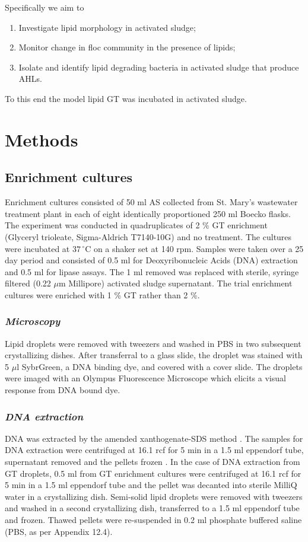 \documentclass{article}
\begin{document}
\noindent
Specifically we aim to

\begin{enumerate}
\item Investigate lipid morphology in activated sludge;
\item Monitor change in floc community in the presence of lipids;
\item Isolate and identify lipid degrading bacteria in activated sludge that produce AHLs.
\end{enumerate}
To this end the model lipid GT was incubated in activated sludge.
\newpage
\section{Methods}

\subsection{Enrichment cultures}
Enrichment cultures consisted of 50 ml AS collected from St. Mary's wastewater treatment plant in each of eight identically proportioned 250 ml Boecko flasks. The experiment was conducted in quadruplicates of 2 \% GT enrichment (Glyceryl trioleate, Sigma-Aldrich T7140-10G) and no treatment. The cultures were incubated at $37\,^{\circ}\mathrm{C}$ on a shaker set at 140 rpm. Samples were taken over a 25 day period and consisted of 0.5 ml for Deoxyribonucleic Acids (DNA) extraction and 0.5 ml for lipase assays. The 1 ml removed was replaced with sterile, syringe filtered (0.22 $\mu$m Millipore) activated sludge supernatant. The trial enrichment cultures were enriched with 1 \% GT rather than 2 \%.

\subsubsection{\emph{Microscopy}}
Lipid droplets were removed with tweezers and washed in PBS in two subsequent crystallizing dishes. After transferral to a glass slide, the droplet was stained with 5 $\mu$l SybrGreen, a DNA binding dye, and covered with a cover slide. The droplets were imaged with an Olympus Fluorescence Microscope which elicits a visual response from DNA bound dye.

\subsubsection{\emph{DNA extraction}}
DNA was extracted by the amended xanthogenate-SDS method \cite{tillett2000xanthogenate}. The samples for DNA extraction were centrifuged at 16.1 rcf for 5 min in a 1.5 ml eppendorf tube, supernatant removed and the pellets frozen . In the case of DNA extraction from GT droplets, 0.5 ml from GT enrichment cultures were centrifuged at 16.1 rcf for 5 min in a 1.5 ml eppendorf tube and the pellet was decanted into sterile MilliQ water in a crystallizing dish. Semi-solid lipid droplets were removed with tweezers and washed in a second crystallizing dish, transferred to a 1.5 ml eppendorf tube and frozen. Thawed pellets were re-suspended in 0.2 ml phosphate buffered saline (PBS, as per Appendix 12.4).
\end{document}
